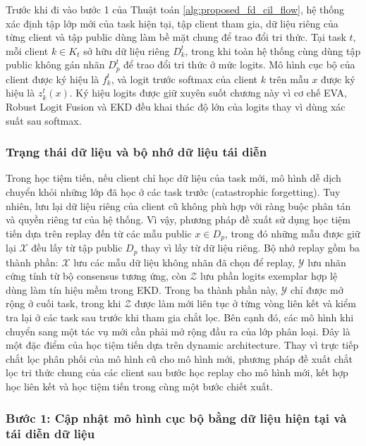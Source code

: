Trước khi đi vào bước 1 của Thuật toán \ref{alg:proposed_fd_cil_flow}, hệ thống xác định tập lớp mới của task hiện tại, tập client tham gia, dữ liệu riêng của từng client và tập public dùng làm bề mặt chung để trao đổi tri thức. Tại task $t$, mỗi client $k\in K_t$ sở hữu dữ liệu riêng $D_k^t$, trong khi toàn hệ thống cùng dùng tập public không gán nhãn $D_p^t$ để trao đổi tri thức ở mức logits. Mô hình cục bộ của client được ký hiệu là $f_k^t$, và logit trước softmax của client $k$ trên mẫu $x$ được ký hiệu là $z_k^t(x)$. Ký hiệu logits được giữ xuyên suốt chương này vì cơ chế EVA, Robust Logit Fusion và EKD đều khai thác độ lớn của logits thay vì dùng xác suất sau softmax.

\subsubsection{Trạng thái dữ liệu và bộ nhớ dữ liệu tái diễn}

Trong học tiệm tiến, nếu client chỉ học dữ liệu của task mới, mô hình dễ dịch chuyển khỏi những lớp đã học ở các task trước (catastrophic forgetting). Tuy nhiên, lưu lại dữ liệu riêng của client cũ không phù hợp với ràng buộc phân tán và quyền riêng tư của hệ thống. Vì vậy, phương pháp đề xuất sử dụng học tiệm tiến dựa trên replay đến từ các mẫu public $x \in D_p$, trong đó những mẫu được giữ lại $\mathcal X$ đều lấy từ tập public $D_p$ thay vì lấy từ dữ liệu riêng. Bộ nhớ replay gồm ba thành phần: $\mathcal X$ lưu các mẫu dữ liệu không nhãn đã chọn để replay, $\mathcal Y$ lưu nhãn cứng tính từ bộ consensus tương ứng, còn $\mathcal Z$ lưu phần logits exemplar hợp lệ dùng làm tín hiệu mềm trong EKD. Trong ba thành phần này, $\mathcal Y$ chỉ được mở rộng ở cuối task, trong khi $\mathcal Z$ được làm mới liên tục ở từng vòng liên kết và kiểm tra lại ở các task sau trước khi tham gia chắt lọc. Bên cạnh đó, các mô hình khi chuyển sang một tác vụ mới cần phải mở rộng đầu ra của lớp phân loại. Đây là một đặc điểm của học tiệm tiến dựa trên dynamic architecture. Thay vì trực tiếp chắt lọc phân phối của mô hình cũ cho mô hình mới, phương pháp đề xuất chắt lọc tri thức chung của các client sau bước học replay cho mô hình mới, kết hợp học liên kết và học tiệm tiến trong cùng một bước chiết xuất.

\subsubsection{Bước 1: Cập nhật mô hình cục bộ bằng dữ liệu hiện tại và tái diễn dữ liệu}


